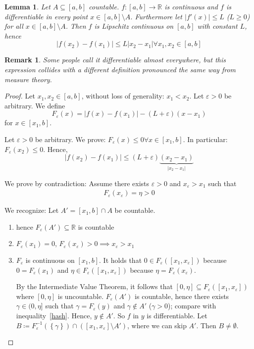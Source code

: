 \documentclass{article}
\newtheorem{lemma}{Lemma}  \numberwithin{lemma}{section}
\newtheorem{remark}{Remark}  \numberwithin{remark}{section}
\newcommand{\set}[1]{\left\{#1\right\}}
\newcommand{\card}[1]{\left|#1\right|}
\begin{document}
\begin{lemma} %
  \label{lemma10}
  Let $A \subseteq [a,b]$ countable.
  $f: [a,b] \to \mathbb R$ is continuous and $f$ is differentiable in every point $x \in [a,b] \setminus A$.
  Furthermore let $\card{f'(x)} \leq L$ ($L \geq 0$) for all $x \in [a,b] \setminus A$.
  Then $f$ is Lipschitz continuous on $[a,b]$ with constant $L$, hence
  \[ \card{f(x_2) - f(x_1)} \leq L \card{x_2 - x_1} \forall x_1, x_2 \in [a,b] \]
\end{lemma}
\begin{remark}
  Some people call it \emph{differentiable almost everywhere},
  but this expression collides with a different definition
  pronounced the same way from measure theory.
\end{remark}
\begin{proof}
  Let $x_1, x_2 \in [a,b]$, without loss of generality: $x_1 < x_2$.
  Let $\varepsilon > 0$ be arbitrary. We define
  \[ F_{\varepsilon}(x) = \card{f(x) - f(x_1)} - (L + \varepsilon)(x - x_1) \]
  for $x \in [x_1, b]$.

  Let $\varepsilon > 0$ be arbitrary.
  We prove: $F_{\varepsilon}(x) \leq 0 \forall x \in [x_1, b]$.
  In particular: $F_{\varepsilon}(x_2) \leq 0$. Hence,
  \[ \card{f(x_2) - f(x_1)} \leq (L + \varepsilon)\underbrace{(x_2 - x_1)}_{\card{x_2 - x_1}} \]

  We prove by contradiction:
  Assume there exists $\varepsilon > 0$ and $x_{\varepsilon} > x_1$
  such that
  \begin{align}
    F_{\varepsilon}(x_{\varepsilon}) = \eta > 0
    \label{hash}
  \end{align}

  We recognize:
  Let $A' = [x_1, b] \cap A$ be countable.
  \begin{enumerate}
    \item hence $F_{\varepsilon}(A') \subseteq \mathbb R$ is countable
    \item $F_{\varepsilon}(x_1) = 0$, $F_{\varepsilon}(x_{\varepsilon}) > 0 \implies x_{\varepsilon} > x_1$
    \item $F_{\varepsilon}$ is continuous on $[x_1, b]$.
      It holds that $0 \in F_{\varepsilon}([x_1, x_{\varepsilon}])$ because $0 = F_{\varepsilon}(x_1)$
      and $\eta \in F_{\varepsilon}([x_1, x_{\varepsilon}])$ because $\eta = F_{\varepsilon}(x_{\varepsilon})$.

      By the Intermediate Value Theorem, it follows that $[0, \eta] \subseteq F_{\varepsilon}([x_1, x_{\varepsilon}])$ where $[0, \eta]$ is uncountable.
      $F_{\varepsilon}(A')$ is countable, hence there exists $\gamma \in (0, \eta]$ such that $\gamma = F_{\varepsilon}(y)$ and $\gamma \not\in A'$ ($\gamma > 0$); compare with inequality~\eqref{hash}.
      Hence, $y \not\in A'$. So $f$ in $y$ is differentiable.
      Let $B \coloneqq F_{\varepsilon}^{-1}(\set{\gamma}) \cap \left([x_1, x_{\varepsilon}] \setminus A'\right)$, where we can skip $A'$.
      Then $B \neq \emptyset$.


\end{enumerate}
\end{proof}
\end{document}
